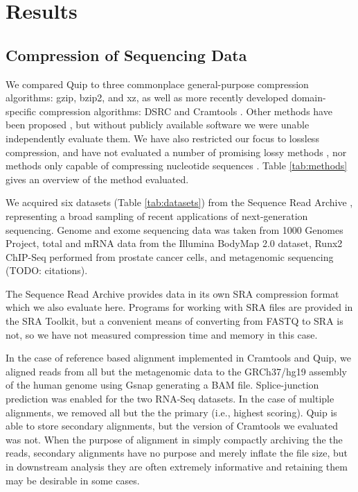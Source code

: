 \documentclass[twocolumn]{article}
\begin{document}
\section{Results}
\label{section:results}

\subsection{Compression of Sequencing Data}


We compared Quip to three commonplace general-purpose compression algorithms:
gzip, bzip2, and xz, as well as more recently developed domain-specific
compression algorithms: DSRC \citep{Deorowicz2011} and Cramtools \citep{Hsi-
YangFritz2011}. Other methods have been proposed \citep{Tembe2010,
Kozanitis2011, Bhola2011}, but without publicly available software we were
unable independently evaluate them. We have also restricted our focus to
lossless compression, and have not evaluated a number of promising lossy
methods \citep{Hsi-YangFritz2011,Wan2011,Hach2012}, nor methods only capable
of compressing nucleotide sequences \citep{Cox2012}. Table \ref{tab:methods}
gives an overview of the method evaluated.

We acquired six datasets (Table \ref{tab:datasets}) from the Sequence Read
Archive \citep{Leinonen2011}, representing a broad sampling of recent
applications of next-generation sequencing. Genome and exome sequencing data
was taken from 1000 Genomes Project, total and mRNA data from the Illumina
BodyMap 2.0 dataset, Runx2 ChIP-Seq performed from prostate cancer cells,
and metagenomic sequencing (TODO: citations).

The Sequence Read Archive provides data in its own SRA compression format
which we also evaluate here. Programs for working with SRA files are provided
in the SRA Toolkit, but a convenient means of converting from FASTQ to SRA is
not, so we have not measured compression time and memory in this case.


In the case of reference based alignment implemented in Cramtools and Quip, we
aligned reads from all but the metagenomic data to the GRCh37/hg19 assembly of
the human genome using Gsnap generating a BAM file. Splice-junction prediction
was enabled for the two RNA-Seq datasets. In the case of multiple alignments,
we removed all but the the primary (i.e., highest scoring). Quip is able to
store secondary alignments, but the version of Cramtools we evaluated was not.
When the purpose of alignment in simply compactly archiving the the reads,
secondary alignments have no purpose and merely inflate the file size, but in
downstream analysis they are often extremely informative and retaining them
may be desirable in some cases.
\end{document}
